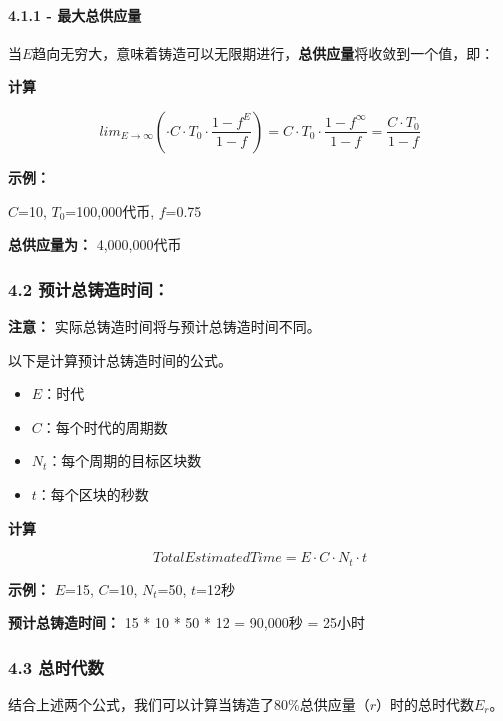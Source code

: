 \documentclass[
]{article}
\providecommand{\tightlist}{%
  \setlength{\itemsep}{0pt}\setlength{\parskip}{0pt}}
\begin{document}
\paragraph{4.1.1 -
最大总供应量}\label{ux6700ux5927ux603bux4f9bux5e94ux91cf}

当\(E\)趋向无穷大，意味着铸造可以无限期进行，\textbf{总供应量}将收敛到一个值，即：

\textbf{计算}

\begin{equation}
lim_{E→\infty}(\cdot C \cdot T_0\cdot\frac{1-f^E}{1-f})=C \cdot T_0\cdot \frac{1-f^{\infty}}{1-f}=\frac{C\cdot T_0}{1-f}
\end{equation}

\textbf{示例：}

\(C\)=10, \(T_0\)=100,000代币, \(f\)=0.75

\textbf{总供应量为：} 4,000,000代币

\subsubsection{4.2
预计总铸造时间：}\label{ux9884ux8ba1ux603bux94f8ux9020ux65f6ux95f4}

\textbf{注意：} 实际总铸造时间将与预计总铸造时间不同。

以下是计算预计总铸造时间的公式。

\begin{itemize}
\tightlist
\item
  \(E\)：时代
\item
  \(C\)：每个时代的周期数
\item
  \(N_t\)：每个周期的目标区块数
\item
  \(t\)：每个区块的秒数
\end{itemize}

\textbf{计算}

\begin{equation}
TotalEstimatedTime = E \cdot C \cdot N_t \cdot t
\end{equation}

\textbf{示例：} \(E\)=15, \(C\)=10, \(N_t\)=50, \(t\)=12秒

\textbf{预计总铸造时间：} 15 * 10 * 50 * 12 = 90,000秒 = 25小时

\subsubsection{4.3 总时代数}\label{ux603bux65f6ux4ee3ux6570}

结合上述两个公式，我们可以计算当铸造了80\%总供应量（\(r\)）时的总时代数\(E_r\)。
\end{document}
